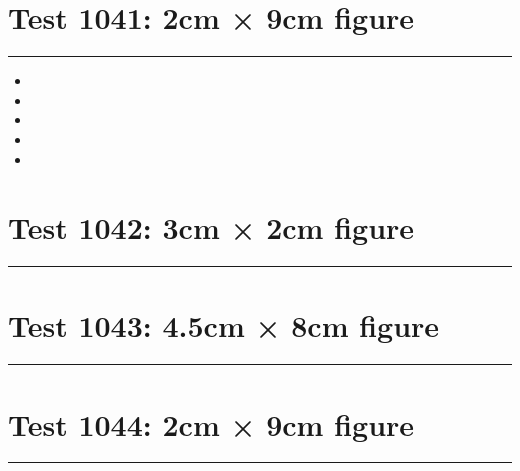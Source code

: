 \documentclass[a4paper,11pt]{article}
\begin{document}
\section*{Test 1041: 2cm × 9cm figure}
\begin{swarmwrap}%
  \begin{minipage}[t]{2cm}
    \centering
    \rule{\linewidth}{9cm}
  \end{minipage}%
\end{swarmwrap}%
\swarmwrapnext
\lipsum[62]
\begin{itemize}
  \item \lipsum[63][1-3]
  \item \lipsum[64][1-3]
  \item \lipsum[65][1-3]
  \item \lipsum[66][1-3]
  \item \lipsum[67][1-3]
\end{itemize}
\section*{Test 1042: 3cm × 2cm figure}
\begin{swarmwrap}%
  \begin{minipage}[t]{3cm}
    \centering
    \rule{\linewidth}{2cm}
  \end{minipage}%
\end{swarmwrap}%
\swarmwrapnext
\lipsum[142]
\lipsum[143]
\lipsum[144]
\lipsum[145]
\section*{Test 1043: 4.5cm × 8cm figure}
\begin{swarmwrap}%
  \begin{minipage}[t]{4cm}
    \centering
    \rule{\linewidth}{8cm}
  \end{minipage}%
\end{swarmwrap}%
\swarmwrapnext
\lipsum[62]
\lipsum[63]
\lipsum[64]
\lipsum[65]
\lipsum[66]
\lipsum[67]
\section*{Test 1044: 2cm × 9cm figure}
\begin{swarmwrap}%
  \begin{minipage}[t]{2cm}
    \centering
    \rule{\linewidth}{9cm}
  \end{minipage}%
\end{swarmwrap}%
\swarmwrapnext
\lipsum[148]
\lipsum[149]
\lipsum[150]
\lipsum[1]
\lipsum[2]
\lipsum[3]
\end{document}
